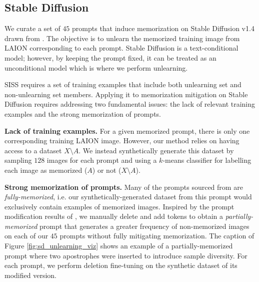 \documentclass{article} \usepackage{iclr2025_conference,times}
\begin{document}
\begin{table}
\begin{minipage}{0.38\textwidth}
\end{minipage}
\end{table}


\subsection{Stable Diffusion}
\label{sec:sd}

We curate a set of $45$ prompts that induce memorization on Stable Diffusion v1.4 drawn from \citet{webster2023reproducible}. The objective is to unlearn the memorized training image from LAION corresponding to each prompt. Stable Diffusion is a text-conditional model; however, by keeping the prompt fixed, it can be treated as an unconditional model which is where we perform unlearning. 

SISS requires a set of training examples that include both unlearning set and non-unlearning set members. Applying it to memorization mitigation on Stable Diffusion requires addressing two fundamental issues: the lack of relevant training examples and the strong memorization of prompts.

\textbf{Lack of training examples.} For a given memorized prompt, there is only one corresponding training LAION image.  However, our method relies on having access to a dataset $X\setminus A$. We instead synthetically generate this dataset by sampling $128$ images for each prompt and using a $k$-means classifier for labelling each image as memorized ($A$) or not ($X\setminus A$).

\textbf{Strong memorization of prompts.} Many of the prompts sourced from \citet{webster2023reproducible} are \textit{fully-memorized}, i.e. our synthetically-generated dataset from this prompt would exclusively contain examples of memorized images. Inspired by the prompt modification results of \citet{somepalli2023understanding}, we manually delete and add tokens to obtain a \textit{partially-memorized} prompt that generates a greater frequency of non-memorized images on each of our $45$ prompts without fully mitigating memorization. The caption of Figure \ref{fig:sd_unlearning_viz} shows an example of a partially-memorized prompt where two apostrophes were inserted to introduce sample diversity. For each prompt, we perform deletion fine-tuning on the synthetic dataset of its modified version. 
\end{document}
